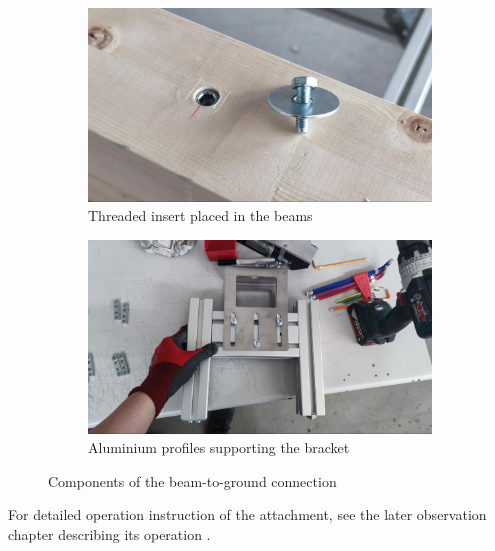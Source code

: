 \begin{figure}[!h]
    \centering
    \begin{subfigure}[b]{0.49\textwidth}
        \centering
        \includegraphics[width=\textwidth]{images/7a/img61.jpg}
        \caption{Threaded insert placed in the beams}
        \label{fig:threaded-insert-placed-in-the-beams}
    \end{subfigure}
    \hfill
    \begin{subfigure}[b]{0.49\textwidth}
        \centering
        \includegraphics[width=\textwidth]{images/7a/img62.jpg}
        \caption{Aluminium profiles supporting the bracket}
        \label{fig:aluminium-profiles-supporting-the-bracket}
    \end{subfigure}
    \caption{Components of the beam-to-ground connection}
\end{figure}


For detailed operation instruction of the attachment, see the later observation chapter describing its operation .

